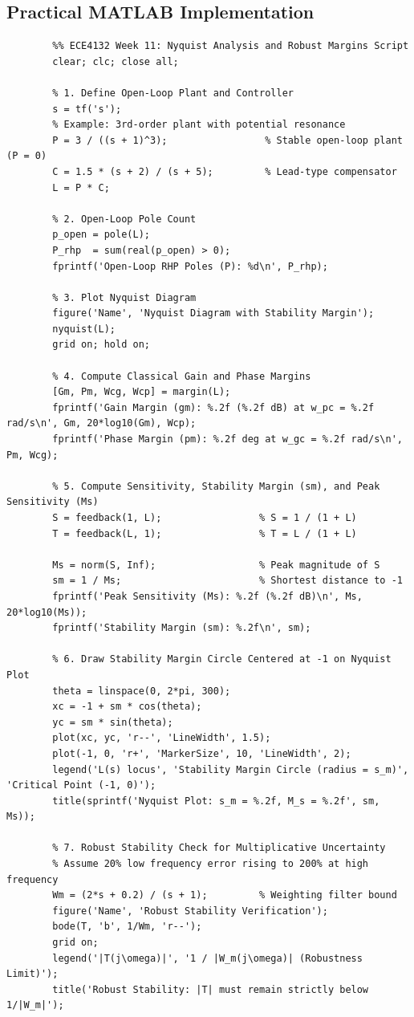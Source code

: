 \documentclass[12pt,onecolumn,twoside ]{article}
\begin{document}
	\subsection{Practical MATLAB Implementation}
	\begin{lstlisting}
		%% ECE4132 Week 11: Nyquist Analysis and Robust Margins Script
		clear; clc; close all;
		
		% 1. Define Open-Loop Plant and Controller
		s = tf('s');
		% Example: 3rd-order plant with potential resonance
		P = 3 / ((s + 1)^3);                 % Stable open-loop plant (P = 0)
		C = 1.5 * (s + 2) / (s + 5);         % Lead-type compensator
		L = P * C;
		
		% 2. Open-Loop Pole Count
		p_open = pole(L);
		P_rhp  = sum(real(p_open) > 0);
		fprintf('Open-Loop RHP Poles (P): %d\n', P_rhp);
		
		% 3. Plot Nyquist Diagram
		figure('Name', 'Nyquist Diagram with Stability Margin');
		nyquist(L);
		grid on; hold on;
		
		% 4. Compute Classical Gain and Phase Margins
		[Gm, Pm, Wcg, Wcp] = margin(L);
		fprintf('Gain Margin (gm): %.2f (%.2f dB) at w_pc = %.2f rad/s\n', Gm, 20*log10(Gm), Wcp);
		fprintf('Phase Margin (pm): %.2f deg at w_gc = %.2f rad/s\n', Pm, Wcg);
		
		% 5. Compute Sensitivity, Stability Margin (sm), and Peak Sensitivity (Ms)
		S = feedback(1, L);                 % S = 1 / (1 + L)
		T = feedback(L, 1);                 % T = L / (1 + L)
		
		Ms = norm(S, Inf);                  % Peak magnitude of S
		sm = 1 / Ms;                        % Shortest distance to -1
		fprintf('Peak Sensitivity (Ms): %.2f (%.2f dB)\n', Ms, 20*log10(Ms));
		fprintf('Stability Margin (sm): %.2f\n', sm);
		
		% 6. Draw Stability Margin Circle Centered at -1 on Nyquist Plot
		theta = linspace(0, 2*pi, 300);
		xc = -1 + sm * cos(theta);
		yc = sm * sin(theta);
		plot(xc, yc, 'r--', 'LineWidth', 1.5);
		plot(-1, 0, 'r+', 'MarkerSize', 10, 'LineWidth', 2);
		legend('L(s) locus', 'Stability Margin Circle (radius = s_m)', 'Critical Point (-1, 0)');
		title(sprintf('Nyquist Plot: s_m = %.2f, M_s = %.2f', sm, Ms));
		
		% 7. Robust Stability Check for Multiplicative Uncertainty
		% Assume 20% low frequency error rising to 200% at high frequency
		Wm = (2*s + 0.2) / (s + 1);         % Weighting filter bound
		figure('Name', 'Robust Stability Verification');
		bode(T, 'b', 1/Wm, 'r--');
		grid on;
		legend('|T(j\omega)|', '1 / |W_m(j\omega)| (Robustness Limit)');
		title('Robust Stability: |T| must remain strictly below 1/|W_m|');
	\end{lstlisting}
	
\end{document}
